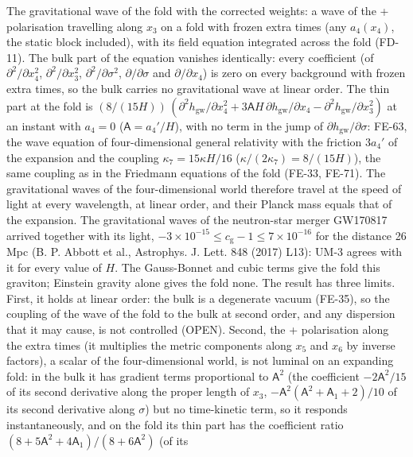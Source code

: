 \documentclass[
  10pt,
]{article}
\begin{document}
The gravitational wave of the fold with the corrected weights: a wave of
the + polarisation travelling along \(x_3\) on a fold with frozen extra
times (any \(a_4(x_4)\), the static block included), with its field
equation integrated across the fold (FD-11). The bulk part of the
equation vanishes identically: every coefficient (of
\(\partial^2/\partial x_4^2\), \(\partial^2/\partial x_3^2\),
\(\partial^2/\partial\sigma^2\), \(\partial/\partial\sigma\) and
\(\partial/\partial x_4\)) is zero on every background with frozen extra
times, so the bulk carries no gravitational wave at linear order. The
thin part at the fold is
\((8/(15H))\,(\partial^2h_{\mathrm{gw}}/\partial x_4^2 + 3\mathsf{A}H\,\partial h_{\mathrm{gw}}/\partial x_4 - \partial^2h_{\mathrm{gw}}/\partial x_3^2)\)
at an instant with \(a_4 = 0\) (\(\mathsf{A} = a_4'/H\)), with no term
in the jump of \(\partial h_{\mathrm{gw}}/\partial\sigma\): FE-63, the
wave equation of four-dimensional general relativity with the friction
\(3a_4'\) of the expansion and the coupling \(\kappa_7 = 15\kappa H/16\)
(\(\kappa/(2\kappa_7) = 8/(15H)\)), the same coupling as in the
Friedmann equations of the fold (FE-33, FE-71). The gravitational waves
of the four-dimensional world therefore travel at the speed of light at
every wavelength, at linear order, and their Planck mass equals that of
the expansion. The gravitational waves of the neutron-star merger
GW170817 arrived together with its light,
\(-3\times10^{-15} \le c_{\mathrm{g}} - 1 \le 7\times10^{-16}\) for the
distance 26 Mpc (B. P. Abbott et al., Astrophys. J. Lett. 848 (2017)
L13): UM-3 agrees with it for every value of \(H\). The Gauss-Bonnet and
cubic terms give the fold this graviton; Einstein gravity alone gives
the fold none. The result has three limits. First, it holds at linear
order: the bulk is a degenerate vacuum (FE-35), so the coupling of the
wave of the fold to the bulk at second order, and any dispersion that it
may cause, is not controlled (OPEN). Second, the + polarisation along
the extra times (it multiplies the metric components along \(x_5\) and
\(x_6\) by inverse factors), a scalar of the four-dimensional world, is
not luminal on an expanding fold: in the bulk it has gradient terms
proportional to \(\mathsf{A}^2\) (the coefficient \(-2\mathsf{A}^2/15\)
of its second derivative along the proper length of \(x_3\),
\(-\mathsf{A}^2(\mathsf{A}^2 + \mathsf{A}_1 + 2)/10\) of its second
derivative along \(\sigma\)) but no time-kinetic term, so it responds
instantaneously, and on the fold its thin part has the coefficient ratio
\((8 + 5\mathsf{A}^2 + 4\mathsf{A}_1)/(8 + 6\mathsf{A}^2)\) (of its
\end{document}
